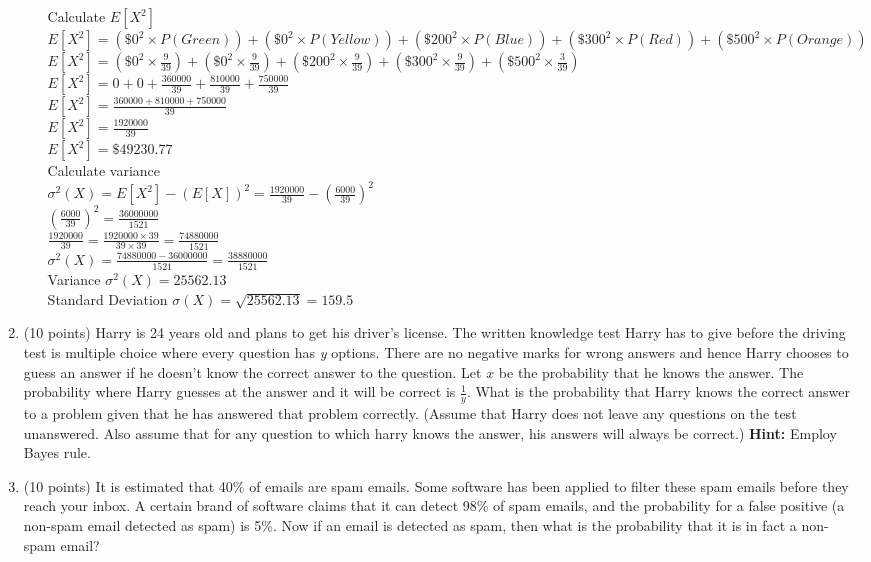 \documentclass{article}%
\begin{document}
\begin{enumerate}
\begin{enumerate}
        Calculate $E[X^2]$\\
        $E[X^2] = (\$0^2 \times P(Green)) + (\$0^2 \times P(Yellow)) + (\$200^2 \times P(Blue)) + (\$300^2 \times P(Red)) + (\$500^2 \times P(Orange))$\\
        $E[X^2] = (\$0^2 \times \frac{9}{39}) + (\$0^2 \times \frac{9}{39}) + (\$200^2 \times \frac{9}{39}) + (\$300^2 \times \frac{9}{39}) + (\$500^2 \times \frac{3}{39})$\\
        $E[X^2] = 0 + 0 + \frac{360000}{39} + \frac{810000}{39} + \frac{750000}{39}$\\
        $E[X^2] = \frac{360000 + 810000 + 750000}{39}$\\
        $E[X^2] = \frac{1920000}{39}$\\
        $E[X^2] = \$49230.77$\\

        Calculate variance\\
        $\sigma^2(X) = E[X^2] - (E[X])^2 = \frac{1920000}{39} - (\frac{6000}{39})^2$\\
        $(\frac{6000}{39})^2 = \frac{36000000}{1521}$\\
        $\frac{1920000}{39} = \frac{1920000 \times 39}{39 \times 39} = \frac{74880000}{1521}$\\
        $\sigma^2(X) = \frac{74880000 - 36000000}{1521} = \frac{38880000}{1521}$\\
        Variance $\sigma^2(X) = 25562.13$\\
        Standard Deviation $\sigma(X) = \sqrt{25562.13} = 159.5$\\
    \end{enumerate}

    \item (10 points) Harry is 24 years old and plans to get his driver's license. The written knowledge test Harry has to give before the driving test is multiple choice where every question has \emph{y} options. There are no negative marks for wrong answers and hence Harry chooses to guess an answer if he doesn't know the correct answer to the question. Let $x$ be the probability that he knows the answer. The probability where Harry guesses at the answer and it will be correct is $\frac{1}{y}$. What is the probability that Harry knows the correct answer to a problem given that he has answered that problem correctly.
    (Assume that Harry does not leave any questions on the test unanswered. Also assume that for any question to which harry knows the answer, his answers will always be correct.) \textbf{Hint:} Employ Bayes rule.
    \item (10 points) It is estimated that 40\% of emails are spam emails. Some software has been applied to filter these spam emails before they reach your inbox. A certain brand of software claims that it can detect 98\% of spam emails, and the probability for a false positive (a non-spam email detected as spam) is 5\%. Now if an email is detected as spam, then what is the probability that it is in fact a non-spam email?
 

\end{enumerate}
\end{document}
